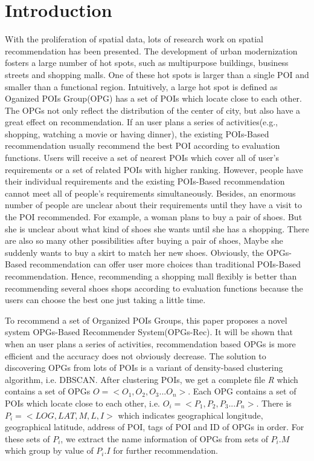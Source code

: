 \documentclass[envcountreset,oribibl]{llncs}
\begin{document}
\section{Introduction}
With the proliferation of spatial data, lots of research work on spatial recommendation has been presented. The development of urban modernization fosters a large number of hot spots, such as multipurpose buildings, business streets and shopping malls. One of these hot spots is larger than a single POI and smaller than a functional region\cite{Yuan12}. Intuitively, a large hot spot is defined as Oganized POIs Group(OPG)\cite{Xu15} has a set of POIs which locate close to each other. The OPGs not only reflect the distribution of the center of city, but also have a great effect on recommendation. If an user plans a series of activities(e.g., shopping, watching a movie or having dinner), the existing POIs-Based recommendation usually recommend the best POI according to evaluation functions. Users will receive a set of nearest POIs which cover all of user's requirements\cite{Cao11} or a set of related POIs with higher ranking\cite{Chen15}. However, people have their individual requirements and the existing POIs-Based recommendation cannot meet all of people's requirements simultaneously. Besides, an enormous number of people are unclear about their requirements until they have a visit to the POI recommended. For example, a woman plans to buy a pair of shoes. But she is unclear about what kind of shoes she wants until she has a shopping. There are also so many other possibilities after buying a pair of shoes, Maybe she suddenly wants to buy a skirt to match her new shoes. Obviously, the OPGs-Based recommendation can offer user more choices than traditional POIs-Based recommendation. Hence, recommending a shopping mall flexibly is better than recommending several shoes shops according to evaluation functions because the users can choose the best one just taking a little time.

To recommend a set of Organized POIs Groups, this paper proposes a novel system OPGs-Based Recommender System(OPGs-Rec). It will be shown that when an user plans a series of activities, recommendation based OPGs is more efficient and the accuracy does not obviously decrease. The solution to discovering OPGs from lots of POIs is a variant of density-based clustering algorithm, i.e. DBSCAN\cite{Xu15}. After clustering POIs, we get a complete file \textit{R} which contains a set of OPGs $O=<O_1, O_2, O_3...O_n>$. Each OPG contains a set of POIs which locate close to each other, i.e. $O_i=<P_1, P_2, P_3...P_n>$. There is $P_i=<LOG, LAT, M, L, I>$ which indicates geographical longitude, geographical latitude, address of POI, tags of POI and ID of OPGs in order. For these sets of $P_i$, we extract the name information of OPGs from sets of $P_i.M$ which group by value of $P_i.I$ for further recommendation.
\end{document}
